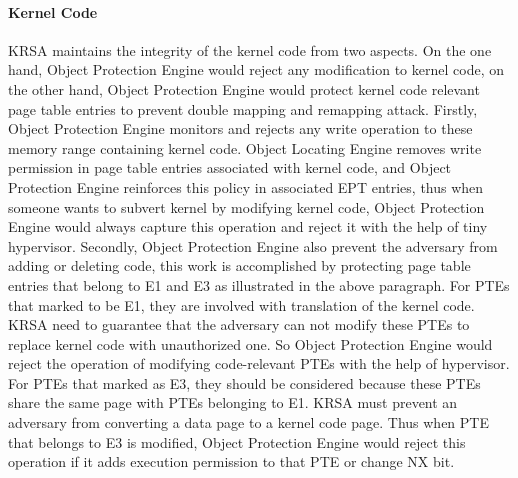 \documentclass[conference]{IEEEtran}
\begin{document}
\paragraph{Kernel Code}
KRSA maintains the integrity of the kernel code from two aspects. On the one hand, Object Protection Engine would reject any modification to kernel code, on the other hand, Object Protection Engine would protect kernel code relevant page table entries to prevent double mapping and remapping attack. 
Firstly, Object Protection Engine monitors and rejects any write operation to these memory range containing kernel code. Object Locating Engine removes write permission in page table entries associated with kernel code, and Object Protection Engine reinforces this policy in associated EPT entries, thus when someone wants to subvert kernel by modifying kernel code, Object Protection Engine would always capture this operation and reject it with the help of tiny hypervisor. Secondly, Object Protection Engine also prevent the adversary from adding or deleting code, this work is accomplished by protecting page table entries that belong to E1 and E3 as illustrated in the above paragraph. 
For PTEs that marked to be E1, they are involved with translation of the kernel code. KRSA need to guarantee that the adversary can not modify these PTEs to replace kernel code with unauthorized one. So Object Protection Engine would reject the operation of modifying code-relevant PTEs with the help of hypervisor. 
For PTEs that marked as E3, they should be considered because these PTEs share the same page with PTEs belonging to E1. KRSA must prevent an adversary from converting a data page to a kernel code page. 
Thus when PTE that belongs to E3 is modified, Object Protection Engine would reject this operation if it adds execution permission to that PTE or change NX bit. 
\end{document}
